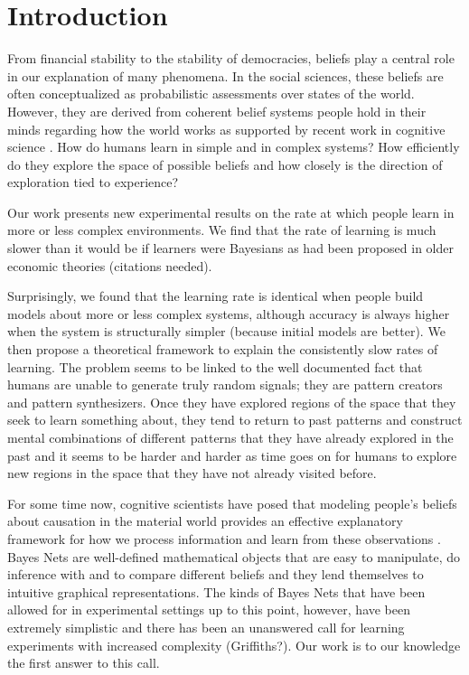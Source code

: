 \section{Introduction}
From financial stability to the stability of democracies, beliefs play a central role in our explanation of many phenomena. In the social sciences, these beliefs are often conceptualized as probabilistic assessments over states of the world.  However, they are derived from coherent belief systems people hold in their minds regarding how the world works as supported by recent work in cognitive science \cite{Lombrozo06, Anderson09}.  How do humans learn in simple and in complex systems?  How efficiently do they explore the space of possible beliefs and how closely is the direction of exploration tied to experience?  

Our work presents new experimental results on the rate at which people learn in more or less complex environments. We find that the rate of learning is much slower than it would be if learners were Bayesians as had been proposed in older economic theories (citations needed).

 Surprisingly, we found that the learning rate is identical when people build models about more or less complex systems, although accuracy is always higher when the system is structurally simpler (because initial models are better). We then propose a theoretical framework to explain the consistently slow rates of learning.  The problem seems to be linked to the well documented fact that humans are unable to generate truly random signals; they are pattern creators and pattern synthesizers.  Once they have explored regions of the space that they seek to learn something about, they tend to return to past patterns and construct mental combinations of different patterns that they have already explored in the past and it seems to be harder and harder as time goes on for humans to explore new regions in the space that they have not already visited before.

For some time now, cognitive scientists have posed that modeling people's beliefs about causation in the material world provides an effective explanatory framework for how we process information and learn from these observations \cite{Griffiths2008}.  Bayes Nets are well-defined mathematical objects that are easy to manipulate, do inference with and to compare different beliefs and they lend themselves to intuitive graphical representations.  The kinds of Bayes Nets that have been allowed for in experimental settings up to this point, however, have been extremely simplistic and there has been an unanswered call for learning experiments with increased complexity (Griffiths?).  Our work is to our knowledge the first answer to this call.  

